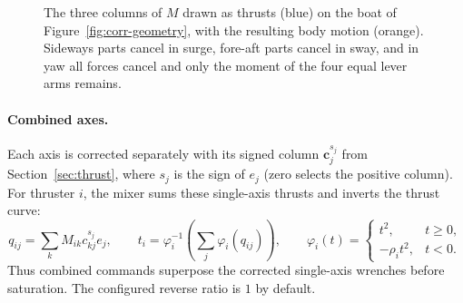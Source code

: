 \begin{figure}[htbp]
\centering
{}
\caption{The three columns of $M$ drawn as thrusts (blue) on the boat of
Figure~\ref{fig:corr-geometry}, with the resulting body motion (orange). Sideways
parts cancel in surge, fore-aft parts cancel in sway, and in yaw all forces cancel
and only the moment of the four equal lever arms remains.}
\label{fig:corr-columns}
\end{figure}

\paragraph{Combined axes.} Each axis is corrected separately with its signed
column $\bm c_j^{s_j}$ from Section~\ref{sec:thrust}, where $s_j$ is the sign
of $e_j$ (zero selects the positive column). For thruster $i$, the mixer sums
these single-axis thrusts and inverts the thrust curve:
\[
  q_{ij}=\sum_k M_{ik}c^{s_j}_{kj}e_j,\qquad
  t_i=\varphi_i^{-1}\!\left(\sum_j\varphi_i(q_{ij})\right),\qquad
  \varphi_i(t)=\begin{cases}t^2,&t\ge0,\\-\rho_i t^2,&t<0.\end{cases}
\]
Thus combined commands superpose the corrected single-axis wrenches before
saturation. The configured reverse ratio is $1$ by default.

